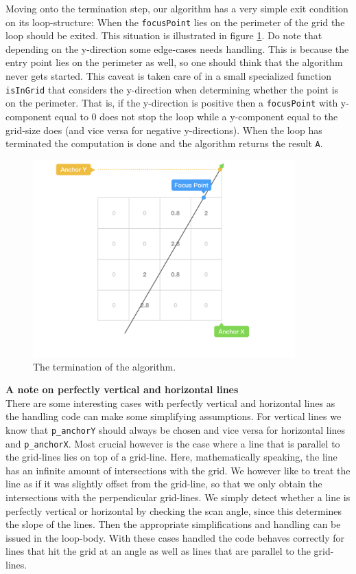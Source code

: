 Moving onto the termination step, our algorithm has a very simple exit condition on its loop-structure: When the \texttt{focusPoint} lies on the perimeter of the grid the loop should be exited. This situation is illustrated in figure \ref{fig:alg_step_term}. Do note that depending on the y-direction some edge-cases needs handling. This is because the entry point lies on the perimeter as well, so one should think that the algorithm never gets started. This caveat is taken care of in a small specialized function \texttt{isInGrid} that considers the y-direction when determining whether the point is on the perimeter. That is, if the y-direction is positive then a \texttt{focusPoint} with y-component equal to 0 does not stop the loop while a y-component equal to the grid-size does (and vice versa for negative y-directions). When the loop has terminated the computation is done and the algorithm returns the result \texttt{A}.
\begin{figure}[H] 
  \centering
  \includegraphics[width=0.9\textwidth]{figures/alg_term.png}
  \caption{The termination of the algorithm.}
  \label{fig:alg_step_term}
\end{figure}

\textbf{A note on perfectly vertical and horizontal lines}\\
There are some interesting cases with perfectly vertical and horizontal lines as the handling code can make some simplifying assumptions. For vertical lines we know that \texttt{p\_anchorY} should always be chosen and vice versa for horizontal lines and \texttt{p\_anchorX}. Most crucial however is the case where a line that is parallel to the grid-lines lies on top of a grid-line. Here, mathematically speaking, the line has an infinite amount of intersections with the grid. We however like to treat the line as if it was slightly offset from the grid-line, so that we only obtain the intersections with the perpendicular grid-lines. We simply detect whether a line is perfectly vertical or horizontal by checking the scan angle, since this determines the slope of the lines. Then the appropriate simplifications and handling can be issued in the loop-body. With these cases handled the code behaves correctly for lines that hit the grid at an angle as well as lines that are parallel to the grid-lines.